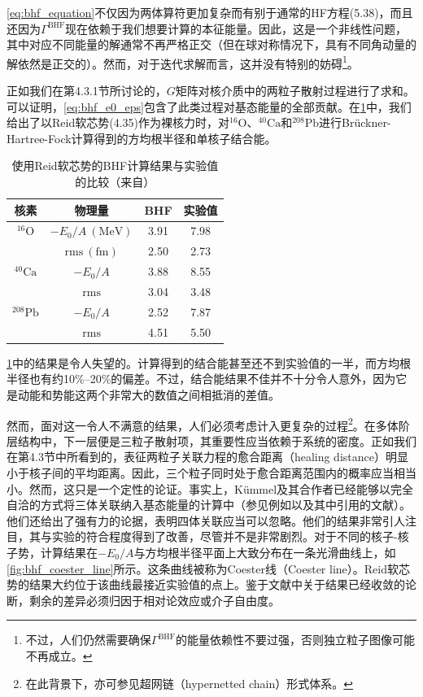 \ref{eq:bhf_equation}不仅因为两体算符更加复杂而有别于通常的HF方程(5.38)，而且还因为$\Gamma^{\mathrm{BHF}}$现在依赖于我们想要计算的本征能量。因此，这是一个非线性问题，其中对应不同能量的解通常不再严格正交（但在球对称情况下，具有不同角动量的解依然是正交的）。然而，对于迭代求解而言，这并没有特别的妨碍\footnote{不过，人们仍然需要确保$\Gamma^{\mathrm{BHF}}$的能量依赖性不要过强，否则独立粒子图像可能不再成立。}。

正如我们在第4.3.1节所讨论的，$G$矩阵对核介质中的两粒子散射过程进行了求和。可以证明，\ref{eq:bhf_e0_eps}包含了此类过程对基态能量的全部贡献\cite{Ma67b}。在\ref{tab:bhf_results_reid}中，我们给出了以Reid软芯势(4.35)作为裸核力时，对$^{16}\mathrm{O}$、$^{40}\mathrm{Ca}$和$^{208}\mathrm{Pb}$进行Brückner-Hartree-Fock计算得到的方均根半径和单核子结合能。

\begin{table}[H]
\begin{centering}
\caption{\label{tab:bhf_results_reid}使用Reid软芯势的BHF计算结果与实验值的比较（来自\cite{DMS73}）}
\par\end{centering}
\centering{}%
\begin{tabular}{|c|c|c|c|}
\hline 
核素 & 物理量 & BHF & 实验值\tabularnewline
\hline 
\hline 
$^{16}\mathrm{O}$ & $-E_{0}/A\ (\mathrm{MeV})$ & 3.91 & 7.98\tabularnewline
 & $\mathrm{rms}\ (\mathrm{fm})$ & 2.50 & 2.73\tabularnewline
\hline 
$^{40}\mathrm{Ca}$ & $-E_{0}/A$ & 3.88 & 8.55\tabularnewline
 & $\mathrm{rms}$ & 3.04 & 3.48\tabularnewline
\hline 
$^{208}\mathrm{Pb}$ & $-E_{0}/A$ & 2.52 & 7.87\tabularnewline
 & $\mathrm{rms}$ & 4.51 & 5.50\tabularnewline
\hline 
\end{tabular}
\end{table}

\ref{tab:bhf_results_reid}中的结果是令人失望的。计算得到的结合能甚至还不到实验值的一半，而方均根半径也有约10\%–20\%的偏差。不过，结合能结果不佳并不十分令人意外，因为它是动能和势能这两个非常大的数值之间相抵消的差值。

然而，面对这一令人不满意的结果，人们必须考虑计入更复杂的过程\footnote{在此背景下，亦可参见超网链（hypernetted chain）形式体系\cite{PB73,FR75,FR76a,LS77,Ri79}。}。在多体阶层结构中，下一层便是三粒子散射项，其重要性应当依赖于系统的密度。正如我们在第4.3节中所看到的，表征两粒子关联力程的愈合距离（healing
distance）明显小于核子间的平均距离。因此，三个粒子同时处于愈合距离范围内的概率应当相当小。然而，这只是一个定性的论证\cite[p. 161]{Be71}。事实上，Kümmel及其合作者已经能够以完全自洽的方式将三体关联纳入基态能量的计算中（参见例如\cite{KLZ75,KLZ78}以及其中引用的文献）。他们还给出了强有力的论据，表明四体关联应当可以忽略。他们的结果非常引人注目，其与实验的符合程度得到了改善，尽管并不是非常剧烈。对于不同的核子-核子势，计算结果在$-E_{0}/A$与方均根半径平面上大致分布在一条光滑曲线上，如\ref{fig:bhf_coester_line}所示。这条曲线被称为Coester线（Coester
line）。Reid软芯势的结果大约位于该曲线最接近实验值的点上。鉴于文献\cite{KLZ75}中关于结果已经收敛的论断，剩余的差异必须归因于相对论效应或介子自由度。


